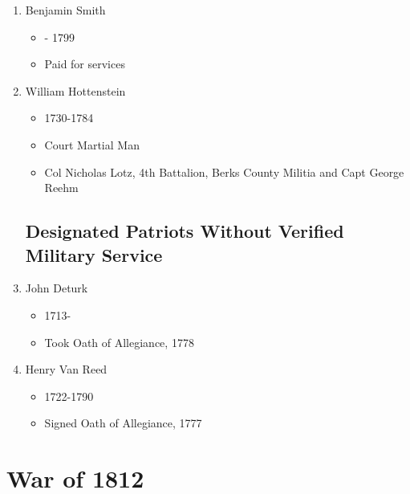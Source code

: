 \documentclass[11pt,letter]{book}
\begin{document}
\begin{enumerate}
\item Benjamin Smith
\begin{itemize}
\item - 1799
\item Paid for services 
\end{itemize}

\item William Hottenstein
\begin{itemize}
\item 1730-1784
\item Court Martial Man
\item Col Nicholas Lotz, 4th Battalion, Berks County Militia and Capt George Reehm
\end{itemize}

\section{Designated Patriots Without Verified Military Service}

\item John Deturk
\begin{itemize}
\item 1713-
\item Took Oath of Allegiance, 1778
\end{itemize}

\item Henry Van Reed
\begin{itemize}
\item 1722-1790
\item Signed Oath of Allegiance, 1777
\end{itemize}
\end{enumerate}

\chapter{War of 1812}
\end{document}
